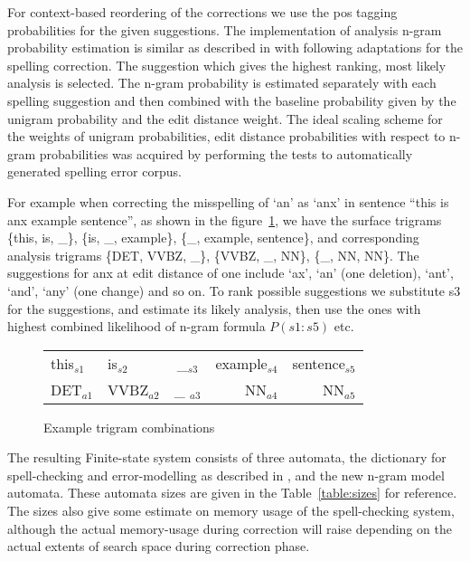 \documentclass{llncs}
\begin{document}
For context-based reordering of the corrections we use the pos tagging
probabilities for the given suggestions. The implementation of analysis n-gram
probability estimation is similar as described in \cite{silfverberg/2010} with
following adaptations for the spelling correction. The suggestion which gives
the highest ranking, most likely analysis is selected.  The n-gram probability
is estimated separately with each spelling suggestion and then combined with
the baseline probability given by the unigram probability and the edit distance
weight. The ideal scaling scheme for the weights of unigram probabilities,
edit distance probabilities with respect to n-gram probabilities was acquired
by performing the tests to automatically generated spelling error corpus.

For example when correcting the misspelling of `an' as `anx' in sentence ``this
is anx example sentence'', as shown in the figure~\ref{fig:example}, we have
the surface trigrams \{this, is, \_\}, \{is, \_, example\}, \{\_, example,
sentence\}, and corresponding analysis trigrams \{DET, VVBZ, \_\}, \{VVBZ, \_,
NN\}, \{\_, NN, NN\}. The suggestions for anx at edit distance of one include
`ax', `an' (one deletion), `ant', `and', `any' (one change) and so on. To rank
possible suggestions we substitute s3 for the suggestions, and estimate its
likely analysis, then use the ones with highest combined likelihood of n-gram
formula $P(s1:s5)$ etc.

\begin{figure}[h]
\begin{centering}
\caption{Example trigram combinations\label{fig:example}}
\begin{scriptsize}
\begin{tabular}{llcrr}
\hline
this$_{s1}$ & is$_{s2}$ & \_$_{s3}$ & example$_{s4}$ & sentence$_{s5}$\\
DET$_{a1}$ & VVBZ$_{a2}$ & \_ $_{a3}$& NN$_{a4}$ & NN$_{a5}$\\
\hline
\end{tabular}
\end{scriptsize}
\end{centering}
\end{figure}

The resulting Finite-state system consists of three automata, the dictionary
for spell-checking and error-modelling as described in
\cite{pirinen/2010/lrec}, and the new n-gram model automata. These automata
sizes are given in the Table~\ref{table:sizes} for reference. The sizes also
give some estimate on memory usage of the spell-checking system, although the
actual memory-usage during correction will raise depending on the actual
extents of search space during correction phase.
\end{document}
